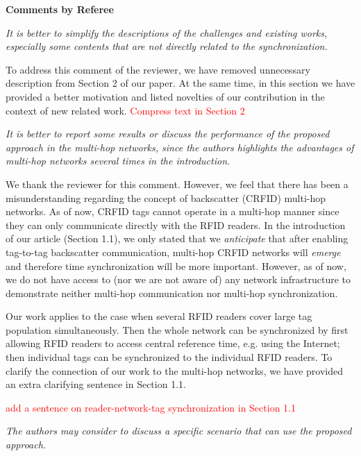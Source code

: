 \documentclass[10pt]{article}
\newcommand{\referee}[1]{
	{\item \color{OliveGreen} \emph{{#1}}}
	\label{R\therefereeCounter:\arabic{enumi}}
}
\newcommand{\response}[1]{{\color{blue} #1}}
\newcounter{refereeCounter}
\newenvironment{responses}{%
\refstepcounter{refereeCounter}%
\textbf{\large Comments by Referee \therefereeCounter}
\begin{enumerate}%
\renewcommand{\labelenumi}{\textbf{[R\therefereeCounter :\,\arabic{enumi}]}} %
}{\end{enumerate}}
\begin{document}
\begin{responses}

\referee{It is better to simplify the descriptions of the challenges and existing works, especially some contents that are not directly related to the synchronization.}
	
\response{
	To address this comment of the reviewer, we have removed unnecessary description from Section 2 of our paper. At the same time, in this section we have provided a better motivation and listed novelties of our contribution in the context of new related work. \textcolor{red}{Compress text in Section 2}
}

\referee{It is better to report some results or discuss the performance of the proposed approach in the multi-hop networks, since the authors highlights the advantages of multi-hop networks several times in the introduction.}
	
\response{
We thank the reviewer for this comment. However, we feel that there has been a misunderstanding regarding the concept of backscatter (CRFID) multi-hop networks. As of now, CRFID tags cannot operate in a multi-hop manner since they can only communicate directly with the RFID readers. In the introduction of our article (Section 1.1), we only stated that we \emph{anticipate} that after enabling tag-to-tag backscatter communication, multi-hop CRFID networks will \emph{emerge} and therefore time synchronization will be more important. However, as of now, we do not have access to (nor we are not aware of) any network infrastructure to demonstrate neither multi-hop communication nor multi-hop synchronization. 

Our work applies to the case when several RFID readers cover large tag population simultaneously. Then the whole network can be synchronized by first allowing RFID readers to access central reference time, e.g. using the Internet; then individual tags can be synchronized to the individual RFID readers. To clarify the connection of our work to the multi-hop networks, we have provided an extra clarifying sentence in Section 1.1.

 \textcolor{red}{add a sentence on reader-network-tag synchronization in Section 1.1}
}
	
\referee{The authors may consider to discuss a specific scenario that can use the proposed approach.}
	

\end{responses}
\end{document}
